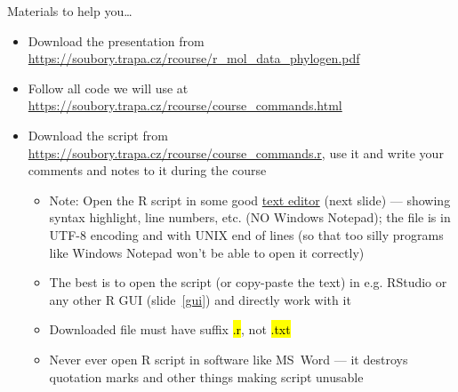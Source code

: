 \documentclass[compress, ucs, xelatex, 11pt, xcolor=svgnames,
	hyperref={
		bookmarks=true,
		unicode=true,
		colorlinks=true,
		pdftitle={Molecular data in R},
		plainpages=false,
		pdfauthor={Vojtech Zeisek},
		pdfsubject={Course about phylogeny and evolution in R},
		pdfcreator={XeLaTeX},
		pdfkeywords={R, evolution, phylogeny, molecular data},
		linkcolor=Tomato,
		anchorcolor=SaddleBrown,
		citecolor=Goldenrod,
		filecolor=DarkMagenta,
		menucolor=Sienna,
		urlcolor=DarkTurquoise,
		pdftex},
	url={hyphens, lowtilde} %
	]{beamer}
\renewcommand{\texttt}[1]{\hl{\ttfamily #1}}
\begin{document}
\begin{frame}{Materials to help you\ldots}
	\begin{itemize}
		\item Download the presentation from \url{https://soubory.trapa.cz/rcourse/r_mol_data_phylogen.pdf}
		\item Follow all code we will use at \url{https://soubory.trapa.cz/rcourse/course_commands.html}
		\item Download the script from \url{https://soubory.trapa.cz/rcourse/course_commands.r}, use it and write your comments and notes to it during the course
		\begin{itemize}
			\item \alert{Note:} Open the R script in some \alert{good} \href{http://texteditors.org/cgi-bin/wiki.pl?PickingATextEditor}{text editor} (next slide) --- showing syntax highlight, line numbers, etc. (\alert{NO} Windows Notepad); the file is in UTF-8 encoding and with UNIX end of lines (so that too silly programs like Windows Notepad won't be able to open it correctly)
			\item The best is to open the script (or copy-paste the text) in e.g. RStudio or any other R GUI (slide~\ref{gui}) and directly work with it
			\item \alert{Downloaded file must have suffix \texttt{*.r}, not \texttt{*.txt}}
			\item \alert{Never ever} open R script in software like MS~Word --- it destroys quotation marks and other things making script unusable
		\end{itemize}
	\end{itemize}
\end{frame}
\end{document}
